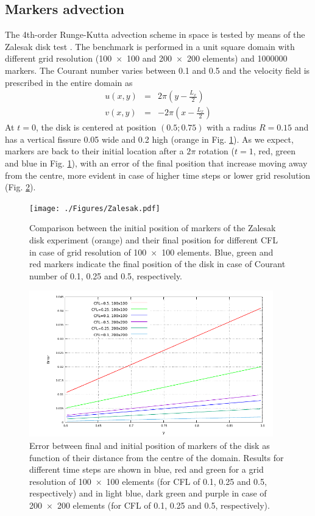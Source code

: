 \documentclass[hidelinks,11pt,a4paper]{article}
\begin{document}
\subsection{Markers advection}\label{sec:runge}
The 4th-order Runge-Kutta advection scheme in space is tested by means of the Zalesak disk test \citep{Zalesak1979,Thieulot2014}. The benchmark is performed in a unit square domain with different grid resolution (\num{100x100} and \num{200x200} elements) and 1000000 markers. The Courant number varies between 0.1 and 0.5 and the velocity field is prescribed in the entire domain as
\begin{eqnarray}
u(x,y)&=&2\pi\left(y-\frac{L_x}{2}\right)\nonumber \\
v(x,y)&=&-2\pi\left(x-\frac{L_x}{2}\right)\nonumber
\end{eqnarray}
At $t=0$, the disk is centered at position $(0.5;0.75)$ with a radius $R=0.15$ and has a vertical fissure 0.05 wide and 0.2 high (orange in Fig. \ref{fig:runge}). As we expect, markers are back to their initial location after a $2\pi$ rotation ($t=1$, red, green and blue in Fig. \ref{fig:runge}), with an error of the final position that increase moving away from the centre, more evident in case of higher time steps or lower grid resolution (Fig. \ref{fig:runge_err}).

\begin{figure}
\centering
\noindent\texttt{[image: ./Figures/Zalesak.pdf]}
\caption{Comparison between the initial position of markers of the Zalesak disk experiment (orange) and their final position for different CFL in case of grid resolution of \num{100x100} elements. Blue, green and red markers indicate the final position of the disk in case of Courant number of 0.1, 0.25 and 0.5, respectively.}
\label{fig:runge}
\end{figure}

\begin{figure}
\centering
\noindent\includegraphics[width=400px]{./Figures/zal_error.pdf}
\caption{Error between final and initial position of markers of the disk as function of their distance from the centre of the domain. Results for different time steps are shown in blue, red and green for a grid resolution of \num{100x100} elements (for CFL of 0.1, 0.25 and 0.5, respectively) and in light blue, dark green and purple in case of \num{200x200} elements (for CFL of 0.1, 0.25 and 0.5, respectively).}
\label{fig:runge_err}
\end{figure}
\end{document}
